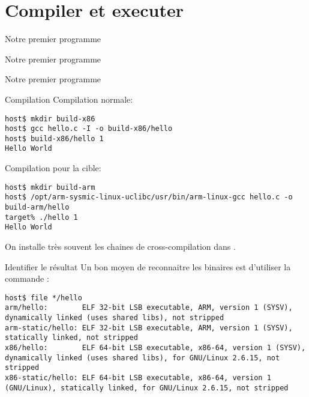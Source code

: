 \section{Compiler et executer}

\begin{frame}[fragile=singleslide]{Notre premier programme}{}
  
\end{frame}

\begin{frame}[fragile=singleslide]{Notre premier programme}{}
  
\end{frame}

\begin{frame}[fragile=singleslide]{Notre premier programme}{}
  
\end{frame}

\begin{frame}[fragile=singleslide]{Compilation}
  Compilation normale:
\begin{lstlisting}
host$ mkdir build-x86
host$ gcc hello.c -I -o build-x86/hello
host$ build-x86/hello 1
Hello World
\end{lstlisting} %
  Compilation pour la cible:
\begin{lstlisting}
host$ mkdir build-arm
host$ /opt/arm-sysmic-linux-uclibc/usr/bin/arm-linux-gcc hello.c -o build-arm/hello
target% ./hello 1
Hello World
\end{lstlisting} %
  On  installe  très souvent  les  chaines  de cross-compilation  dans
  .
\end{frame}

\begin{frame}[fragile=singleslide]{Identifier le résultat}
  Un bon moyen de reconnaitre  les binaires est d'utiliser la commande
  :
\begin{lstlisting}
host$ file */hello
arm/hello:        ELF 32-bit LSB executable, ARM, version 1 (SYSV), dynamically linked (uses shared libs), not stripped
arm-static/hello: ELF 32-bit LSB executable, ARM, version 1 (SYSV), statically linked, not stripped
x86/hello:        ELF 64-bit LSB executable, x86-64, version 1 (SYSV), dynamically linked (uses shared libs), for GNU/Linux 2.6.15, not stripped
x86-static/hello: ELF 64-bit LSB executable, x86-64, version 1 (GNU/Linux), statically linked, for GNU/Linux 2.6.15, not stripped
\end{lstlisting} %
\end{frame}

